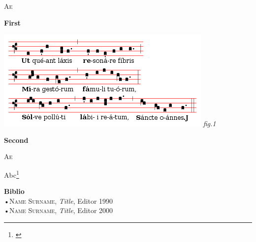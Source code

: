 \documentclass[11pt]{article}
\begin{document}
\begin{multicols*}{2}
\lettrine {A}{e} 
			\lipsum[1]




\textbf{\textsf {First}}

\lipsum[1]


\begin{center}
\includegraphics[scale=0.5]{images/utque.png}
{\scriptsize \emph{fig.1 }}
\end{center}

\lipsum[2]




\textbf{\textsf {Second}}

\lettrine {A}{e} \lipsum[1]

\begin {quote}
\emph{ \lipsum[1] }


\end{quote}

Abc\footnote{\textbf{\textsf {\lipsum[1]}}}
\lipsum[2]




\vfill
\columnbreak


\textbf{\textsf {Biblio}}\\
•\textsc{\textsf {Name Surname}}, \emph{Title}, Editor 1990\\
•\textsc{\textsf {Name Surname}}, \emph{Title}, Editor 2000\\




















\end{multicols*}
\end{document}
